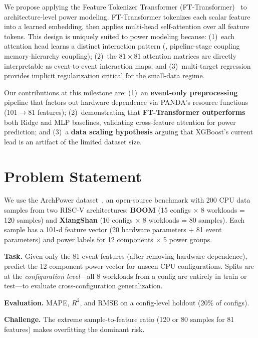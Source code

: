 \documentclass[10pt,twocolumn,letterpaper]{article}
\begin{document}
We propose applying the Feature Tokenizer Transformer
(FT-Transformer)~\cite{gorishniy2021ft_transformer} to architecture-level
power modeling.  FT-Transformer tokenizes each scalar feature into a
learned embedding, then applies multi-head self-attention over all feature
tokens.  This design is uniquely suited to power modeling because:
(1)~each attention head learns a distinct interaction pattern (\eg,
pipeline-stage coupling \vs memory-hierarchy coupling);
(2)~the $81 \times 81$ attention matrices are directly interpretable as
event-to-event interaction maps; and
(3)~multi-target regression provides implicit regularization critical for
the small-data regime.

Our contributions at this milestone are:
(1)~an \textbf{event-only preprocessing} pipeline that factors out
hardware dependence via PANDA's resource functions (101$\to$81 features);
(2)~demonstrating that \textbf{FT-Transformer outperforms} both Ridge and
MLP baselines, validating cross-feature attention for power prediction; and
(3)~a \textbf{data scaling hypothesis} arguing that XGBoost's current lead
is an artifact of the limited dataset size.

\section{Problem Statement}

We use the ArchPower dataset~\cite{zhang2025archpower}, an open-source
benchmark with 200 CPU data samples from two RISC-V architectures:
\textbf{BOOM} (15 configs $\times$ 8 workloads = 120 samples) and
\textbf{XiangShan} (10 configs $\times$ 8 workloads = 80 samples).
Each sample has a 101-d feature vector (20 hardware parameters + 81 event
parameters) and power labels for 12 components $\times$ 5 power groups.

\noindent\textbf{Task.}  Given only the 81 event features (after removing
hardware dependence), predict the 12-component power vector for unseen CPU
configurations.  Splits are at the \emph{configuration level}---all 8
workloads from a config are entirely in train or test---to evaluate
cross-configuration generalization.

\noindent\textbf{Evaluation.}  MAPE, $R^2$, and RMSE on a config-level
holdout (20\% of configs).

\noindent\textbf{Challenge.}  The extreme sample-to-feature ratio (120 or
80 samples for 81 features) makes overfitting the dominant risk.
\end{document}
